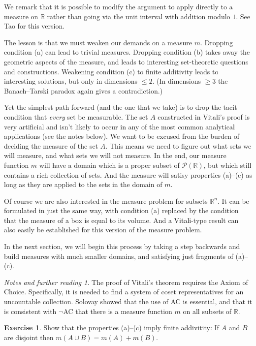 \documentclass[11pt,oneside]{amsbook}
\newcommand{\RR}{{\mathbb R}}
\theoremstyle{definition}
\newtheorem{exerc}{Exercise}[section]
\theoremstyle{plain}
\theoremstyle{definition}
\theoremstyle{remark}
\newtheorem*{notes}{Notes and further reading}
\numberwithin{equation}{section}
\numberwithin{figure}{section}
\begin{document}
We remark that it is possible to modify the argument to apply directly to a measure on $\RR$ rather than going via the unit interval with addition modulo $1$. See Tao for this version.

The lesson is that we must weaken our demands on a measure $m$. Dropping condition (a) can lead to trivial measures. Dropping condition (b) takes away the geometric aspects of the measure, and leads to interesting set-theoretic questions and constructions. Weakening condition (c) to finite additivity leads to interesting solutions, but only in dimensions $\leq2$. (In dimensions $\geq3$ the Banach--Tarski paradox again gives a contradiction.)

Yet the simplest path forward (and the one that we take) is to drop the tacit condition that \emph{every} set be measurable. The set $A$ constructed in Vitali's proof is very artificial and isn't likely to occur in any of the most common analytical applications (see the notes below). We want to be excused from the burden of deciding the measure of the set $A$. This means we need to figure out what sets we will measure, and what sets we will not measure. In the end, our measure function $m$ will have a domain which is a proper subset of $\mathcal P(\RR)$, but which still contains a rich collection of sets. And the measure will satisy properties (a)--(c) as long as they are applied to the sets in the domain of $m$.

Of course we are also interested in the measure problem for subsets $\RR^n$. It can be formulated in just the same way, with condition (a) replaced by the condition that the measure of a box is equal to its volume. And a Vitali-type result can also easily be established for this version of the measure problem.

In the next section, we will begin this process by taking a step backwards and build measures with much smaller domains, and satisfying just fragments of (a)--(c).

\begin{notes}
  The proof of Vitali's theorem requires the Axiom of Choice. Specifically, it is needed to find a system of coset representatives for an uncountable collection. Solovay showed that the use of AC is essential, and that it is consistent with $\neg$AC that there is a measure function $m$ on all subsets of $\RR$.
\end{notes}

\begin{exerc}
  Show that the properties (a)--(c) imply finite addivitity: If $A$ and $B$ are disjoint then $m(A\cup B)=m(A)+m(B)$.
\end{exerc}
\end{document}
